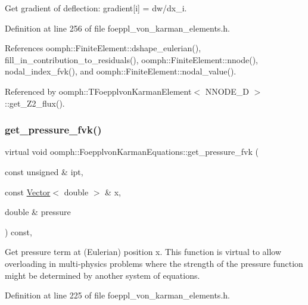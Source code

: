Get gradient of deflection\+: gradient\mbox{[}i\mbox{]} = dw/dx\+\_\+i. 



Definition at line 256 of file foeppl\+\_\+von\+\_\+karman\+\_\+elements.\+h.



References oomph\+::\+Finite\+Element\+::dshape\+\_\+eulerian(), fill\+\_\+in\+\_\+contribution\+\_\+to\+\_\+residuals(), oomph\+::\+Finite\+Element\+::nnode(), nodal\+\_\+index\+\_\+fvk(), and oomph\+::\+Finite\+Element\+::nodal\+\_\+value().



Referenced by oomph\+::\+T\+Foepplvon\+Karman\+Element$<$ N\+N\+O\+D\+E\+\_\+D $>$\+::get\+\_\+\+Z2\+\_\+flux().

\mbox{\label{classoomph_1_1FoepplvonKarmanEquations_a853fb95081108ca7ac59d98677926cab}} 
\subsubsection{\texorpdfstring{get\+\_\+pressure\+\_\+fvk()}{get\_pressure\_fvk()}}
{\footnotesize\ttfamily virtual void oomph\+::\+Foepplvon\+Karman\+Equations\+::get\+\_\+pressure\+\_\+fvk (\begin{DoxyParamCaption}\item[{const unsigned \&}]{ipt,  }\item[{const \hyperlink{classoomph_1_1Vector}{Vector}$<$ double $>$ \&}]{x,  }\item[{double \&}]{pressure }\end{DoxyParamCaption}) const\hspace{0.3cm}{\ttfamily [inline]}, {\ttfamily [virtual]}}



Get pressure term at (Eulerian) position x. This function is virtual to allow overloading in multi-\/physics problems where the strength of the pressure function might be determined by another system of equations. 



Definition at line 225 of file foeppl\+\_\+von\+\_\+karman\+\_\+elements.\+h.




